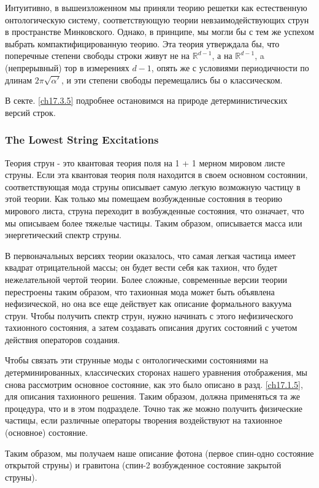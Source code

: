\documentclass[main.tex]{subfiles}
\begin{document}
Интуитивно, в вышеизложенном мы приняли теорию решетки как естественную онтологическую систему, соответствующую теории невзаимодействующих струн в пространстве Минковского. Однако, в принципе, мы могли бы с тем же успехом выбрать компактифицированную теорию. Эта теория утверждала бы, что поперечные степени свободы строки живут не на $\mathbb R^{d-1}$, а на $\mathbb R^{d-1}$, a (непрерывный) тор в измерениях $d - 1$, опять же с условиями периодичности по длинам $2\pi\sqrt{\alpha\prime}$, и эти степени свободы перемещались бы
о классическом.

В секте. \ref{ch17.3.5} подробнее остановимся на природе детерминистических версий строк.


\subsubsection{The Lowest String Excitations}\label{ch17.3.3}

Теория струн - это квантовая теория поля на 1 + 1 мерном мировом листе струны. Если эта квантовая теория поля находится в своем основном состоянии, соответствующая мода струны описывает самую легкую возможную частицу в этой теории. Как только мы помещаем возбужденные состояния в теорию мирового листа, струна переходит в возбужденные состояния, что означает, что мы описываем более тяжелые частицы. Таким образом, описывается масса или энергетический спектр струны.

В первоначальных версиях теории оказалось, что самая легкая частица имеет квадрат отрицательной массы; он будет вести себя как тахион, что будет нежелательной чертой теории.
Более сложные, современные версии теории перестроены таким образом, что тахионная мода может быть объявлена нефизической, но она все еще действует как описание формального вакуума струн. Чтобы получить спектр струн, нужно начинать с этого нефизического тахионного состояния, а затем создавать описания других состояний с учетом действия операторов создания.

Чтобы связать эти струнные моды с онтологическими состояниями на детерминированных, классических сторонах нашего уравнения отображения, мы снова рассмотрим основное состояние, как это было описано в разд. \ref{ch17.1.5}, для описания тахионного решения. Таким образом, должна применяться та же процедура, что и в этом подразделе. Точно так же можно получить физические частицы, если различные операторы творения воздействуют на тахионное (основное) состояние.

Таким образом, мы получаем наше описание фотона (первое спин-одно состояние открытой струны) и гравитона (спин-2 возбужденное состояние закрытой струны).
\end{document}
